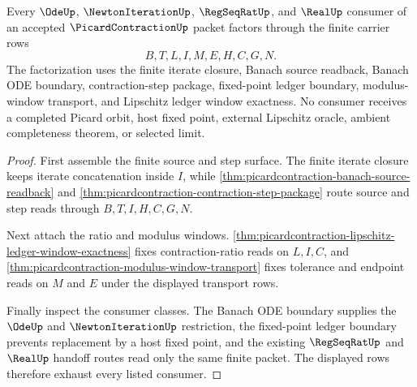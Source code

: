 \begin{theorem}
\label{thm:picardcontraction-modulus-consumer-exhaustion}
Every $\OdeUp$, $\NewtonIterationUp$, $\RegSeqRatUp$, and $\RealUp$ consumer of an accepted $\PicardContractionUp$ packet factors through the finite carrier rows
$$
B,T,L,I,M,E,H,C,G,N.
$$
The factorization uses the finite iterate closure, Banach source readback, Banach ODE boundary, contraction-step package, fixed-point ledger boundary, modulus-window transport, and Lipschitz ledger window exactness. No consumer receives a completed Picard orbit, host fixed point, external Lipschitz oracle, ambient completeness theorem, or selected limit.
\end{theorem}
\begin{proof}
First assemble the finite source and step surface. The finite iterate closure keeps iterate concatenation inside $I$, while \autoref{thm:picardcontraction-banach-source-readback} and \autoref{thm:picardcontraction-contraction-step-package} route source and step reads through $B,T,I,H,C,G,N$.

Next attach the ratio and modulus windows. \autoref{thm:picardcontraction-lipschitz-ledger-window-exactness} fixes contraction-ratio reads on $L,I,C$, and \autoref{thm:picardcontraction-modulus-window-transport} fixes tolerance and endpoint reads on $M$ and $E$ under the displayed transport rows.

Finally inspect the consumer classes. The Banach ODE boundary supplies the $\OdeUp$ and $\NewtonIterationUp$ restriction, the fixed-point ledger boundary prevents replacement by a host fixed point, and the existing $\RegSeqRatUp$ and $\RealUp$ handoff routes read only the same finite packet. The displayed rows therefore exhaust every listed consumer.
\end{proof}

